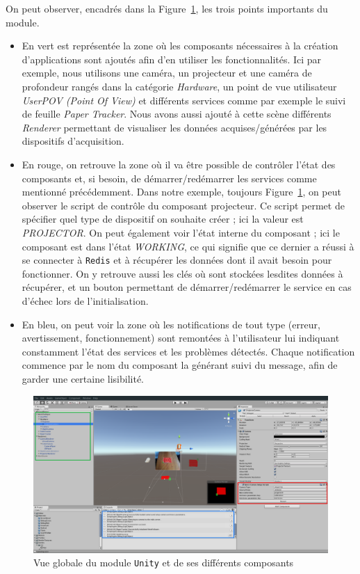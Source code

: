 On peut observer, encadrés dans la Figure~\ref{fig:unity:plugin}, les trois points importants du module. 
\begin{itemize}
\item En vert est représentée la zone où les composants nécessaires à la création d'applications sont ajoutés afin d'en utiliser les fonctionnalités. Ici par exemple, nous utilisons une caméra, un projecteur et une caméra de profondeur rangés dans la catégorie \emph{Hardware}, un point de vue utilisateur \emph{UserPOV (Point Of View)} et différents services comme par exemple le suivi de feuille \emph{Paper Tracker}. Nous avons aussi ajouté à cette scène différents \emph{Renderer} permettant de visualiser les données acquises/générées par les dispositifs d'acquisition.
\item En rouge, on retrouve la zone où il va être possible de contrôler l'état des composants et, si besoin, de démarrer/redémarrer les services comme mentionné précédemment. Dans notre exemple, toujours Figure~\ref{fig:unity:plugin}, on peut observer le script de contrôle du composant projecteur. Ce script permet de spécifier quel type de dispositif on souhaite créer ; ici la valeur est \emph{PROJECTOR}. On peut également voir l'état interne du composant ; ici le composant est dans l'état \emph{WORKING}, ce qui signifie que ce dernier a réussi à se connecter à \texttt{Redis} et à récupérer les données dont il avait besoin pour fonctionner. On y retrouve aussi les clés où sont stockées lesdites données à récupérer, et un bouton permettant de démarrer/redémarrer le service en cas d'échec lors de l'initialisation.
\item En bleu, on peut voir la zone où les notifications de tout type (erreur, avertissement, fonctionnement) sont remontées à l'utilisateur lui indiquant constamment l'état des services et les problèmes détectés. Chaque notification commence par le nom du composant la générant suivi du message, afin de garder une certaine lisibilité.
\end{itemize}

\begin{figure}[H]
\centering
\includegraphics[width=\linewidth]{images/unity-plugin}
\caption{Vue globale du module \texttt{Unity} et de ses différents composants}
\label{fig:unity:plugin}
\end{figure}

